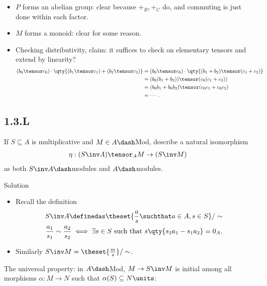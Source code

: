 \begin{itemize}
\item
  \(P\) forms an abelian group: clear because \(+_B, +_C\) do, and
  commuting is just done within each factor.
\item
  \(M\) forms a monoid: clear for some reason.
\item
  Checking distributivity, claim: it suffices to check on elementary
  tensors and extend by linearity? \begin{align*}
  (b_0 \tensor c_0) \cdot \qty{(b_1 \tensor c_1) + (b_2\tensor c_2) } 
  &= (b_0\tensor c_0) \cdot \qty{ (b_1 + b_2) \tensor (c_1 + c_2) } \\
  &= (b_0(b_1 + b_2)) \tensor ( c_0(c_1 + c_2)) \\
  &= (b_0 b_1 + b_0 b_2) \tensor (c_0 c_1 + c_0 c_2) \\
  &= \cdots
   .\end{align*}
\end{itemize}

\hypertarget{l}{%
\subsection{1.3.L}\label{l}}

If \(S\subseteq A\) is multiplicative and \(M\in A\dash\)Mod, describe a
natural isomorphism \begin{align*}
\eta: (S\inv A)\tensor_A M \to (S\inv M)
\end{align*} as both \(S\inv A\dash\)modules and \(A\dash\)modules.

Solution

\begin{itemize}
\tightlist
\item
  Recall the definition \begin{align*}
  S\inv A\definedas \theset{ {a\over s} \suchthat a\in A, s\in S} / \sim \\
  {a_1 \over s_1} \sim {a_2 \over s_2} \iff \exists s\in S \text{ such that } s\qty{ s_2 a_1 - s_1 a_2 } = 0_A
  .\end{align*}
\item
  Similarly \(S\inv M = \theset{{m\over s}}/\sim\).
\end{itemize}

The universal property: in \(A\dash\)Mod, \(M\to S\inv M\) is initial
among all morphisms \(\alpha: M\to N\) such that
\(\alpha(S) \subseteq N\units\):

\begin{center}
\end{center}

